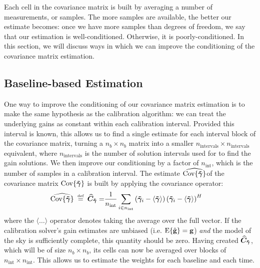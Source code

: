 \pg
Each cell in the covariance matrix is built by averaging a number of measurements, or samples. The more samples are available, the better our estimate becomes: once we have more samples than degrees of freedom, we say that our estimation is well-conditioned. Otherwise, it is poorly-conditioned. In this section, we will discuss ways in which we can improve the conditioning of the covariance matrix estimation.

%
\subsection{Baseline-based Estimation}

\pg
One way to improve the conditioning of our covariance matrix estimation is to make the same hypothesis as the calibration algorithm: we can treat the underlying gains as constant within each calibration interval. Provided this interval is known, this allows us to find a single estimate for each interval block of the covariance matrix, turning a $n_b\times n_b$ matrix into a smaller $n_{\mathrm{intervals}}\times n_{\mathrm{intervals}}$ equivalent, where $n_{\mathrm{intervals}}$ is the number of solution intervals used for to find the gain solutions. We then improve our conditioning by a factor of $n_\mathrm{int}$, which is the number of samples in a calibration interval. The estimate $\widehat{\textrm{Cov}\{\bm{\tilde{\gamma}}\}}$of the covariance matrix $\textrm{Cov}\{\bm{\tilde{\gamma}}\}$ is built by applying the covariance operator:
\begin{align}
\widehat{\Cov{\matGains}} \bydefn \estC =&  \frac{1}{n_\mathrm{int}}\sum_{i\in n_{\mathrm{int}}}\left(\matGains_i- \langle \matGains \rangle\right) \left(\matGains_i - \langle \matGains \rangle \right)^H
\end{align}
where the $\langle \hdots\rangle$ operator denotes taking the average over the full vector. If the calibration solver's gain estimates are unbiased (i.e. $\textrm{E}\{\hat{\textbf{g}}\}=\textbf{g}$) \emph{and} the model of the sky is sufficiently complete, this quantity should be zero. Having created $\widehat{\bm{C}}_{\bm{\tilde{\gamma}}}$, which will be of size $n_b \times n_b$, its cells can now be averaged over blocks of $n_\mathrm{int}\times n_\mathrm{int}$. This allows us to estimate the weights for each baseline and each time.

